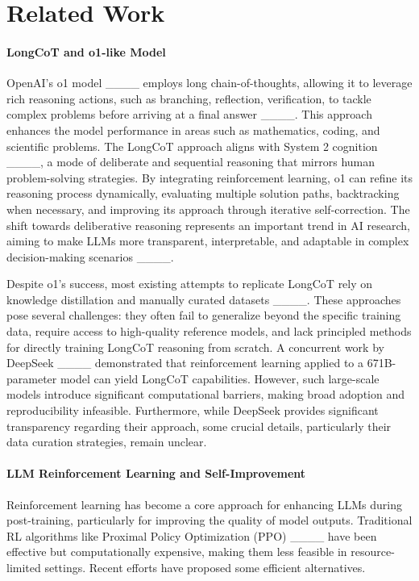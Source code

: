 \section{Related Work}
\paragraph{LongCoT and o1-like Model} 
OpenAI's o1 model ____ employs long chain-of-thoughts, allowing it to leverage rich reasoning actions, such as branching, reflection, verification, to tackle complex problems before arriving at a final answer ____. This approach enhances the model performance in areas such as mathematics, coding, and scientific problems. 
The LongCoT approach aligns with System 2 cognition ____, a mode of deliberate and sequential reasoning that mirrors human problem-solving strategies. By integrating reinforcement learning, o1 can refine its reasoning process dynamically, evaluating multiple solution paths, backtracking when necessary, and improving its approach through iterative self-correction. The shift towards deliberative reasoning represents an important trend in AI research, aiming to make LLMs more transparent, interpretable, and adaptable in complex decision-making scenarios ____.

Despite o1's success, most existing attempts to replicate LongCoT rely on knowledge distillation and manually curated datasets ____. These approaches pose several challenges: they often fail to generalize beyond the specific training data, require access to high-quality reference models, and lack principled methods for directly training LongCoT reasoning from scratch. A concurrent work by DeepSeek ____ demonstrated that reinforcement learning applied to a 671B-parameter model can yield LongCoT capabilities. However, such large-scale models introduce significant computational barriers, making broad adoption and reproducibility infeasible. Furthermore, while DeepSeek provides significant transparency regarding their approach, some crucial details, particularly their data curation strategies, remain unclear.


\paragraph{LLM Reinforcement Learning and Self-Improvement}
Reinforcement learning has become a core approach for enhancing LLMs during post-training, particularly for improving the quality of model outputs. Traditional RL algorithms like Proximal Policy Optimization (PPO) ____ have been effective but computationally expensive, making them less feasible in resource-limited settings. 
Recent efforts have proposed some efficient alternatives. 

